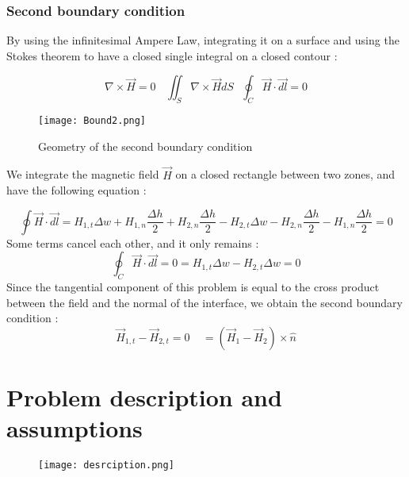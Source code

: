    \subsubsection*{Second boundary condition}
   By using the infinitesimal Ampere Law, integrating it on a surface and using the Stokes theorem to have a closed single integral on a closed contour : 
   
   \begin{equation*}
       \nabla \times \vec{H} =0  ~~~~ \iint_S  \nabla \times \vec{H} dS  ~~~  \oint_C \vec{H}\cdot \vec{dl} = 0
   \end{equation*}
   
   
 \begin{figure}[H]
     \centering
     \texttt{[image: Bound2.png]}
     \caption{Geometry of the second boundary condition}
 \end{figure}
 
 We integrate the magnetic field $\vec{H}$ on a closed rectangle between two zones, and have the following equation :
 
 \begin{equation*}
       \oint \vec{H} \cdot \vec{dl} =  H_{1,t}\Delta w  + H_{1,n}\frac{\Delta h}{2}  + H_{2,n}\frac{\Delta h}{2} - H_{2,t}\Delta w - H_{2,n}\frac{\Delta h}{2}  - H_{1,n}\frac{\Delta h}{2} = 0
   \end{equation*}
   Some terms cancel each other, and it only remains : 
   \begin{equation*}
        \oint_C \vec{H}\cdot \vec{dl} = 0 =  H_{1,t}\Delta w- H_{2,t}\Delta w = 0
   \end{equation*}
Since the tangential component of this problem is equal to the cross product between the field and the normal of the interface, we obtain the second boundary condition : 
   \begin{equation*}
       \vec{H}_{1,t} - \vec{H}_{2,t} = 0 ~~~~~= \boxed{(\vec{H}_1 - \vec{H}_2) \times \hat{n}}
          \end{equation*}





\section{Problem description and assumptions}

\begin{figure}[H]
    \centering
    \texttt{[image: desrciption.png]}
\end{figure}

